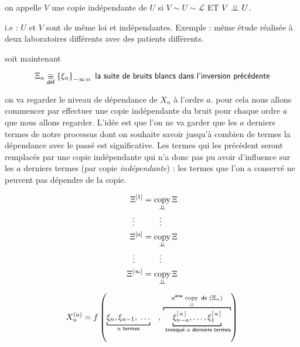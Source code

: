 \begin{definition}
	on appelle $V$ une copie indépendante de $U$ si $V \sim U \sim \mathcal L$ ET $V \perp \!\!\! \perp U$.

	i.e : $U$ et $V$ sont de même loi et indépendantes. Exemple : même étude réalisée à deux laboratoires différents avec des patients différents.
\end{definition}

soit maintenant

$$\Xi_n \underset {\textsf{déf}} {\equiv} \left\{ \xi_n\right\}_{-\infty : n} \textsf{ la suite de bruits blancs dans l'inversion précédente}$$

on va regarder le niveau de dépendance de $X_n$ à l'ordre $a$. pour cela nous allons commencer par effectuer une copie indépendante du bruit pour chaque ordre $a$ que nous allons regarder. L'idée est que l'on ne va garder que les $a$ derniers termes de notre processus dont on souhaite savoir jusqu'à combien de termes la dépendance avec le passé est significative. Les termes qui les précèdent seront remplacés par une copie indépendante qui n'a donc pas pu avoir d'influence sur les $a$ derniers termes (par copie \emph{indépendante}) : les termes que l'on a conservé ne peuvent pas dépendre de la copie.


\begin{minipage}{0.45\textwidth}

	\begin{align*}
		\Xi^{[1]}      & = \operatornamewithlimits{copy}\limits_{\indep} \Xi
		\\
		\vdots\quad    & \quad\quad \vdots
		\\
		\Xi^{[a]}      & = \operatornamewithlimits{copy}\limits_{\indep} \Xi
		\\ \vdots\quad &  \quad\quad \vdots
		\\
		\Xi^{[\infty]} & = \operatornamewithlimits{copy}\limits_{\indep} \Xi
	\end{align*}

\end{minipage}
%
\begin{minipage}{0.45\textwidth}
	$$X_n^{(a)} = f\left(
		\underbracket[0.187ex]{
			\xi_n, \xi_{n-1}, \; \dots}_
		{a \textsf{ termes}}
		\quad , \,
		\overbracket[0.187ex]
		{\underbracket[0.187ex]{\xi_{n-a}^{[\, a \, ]} , \dots , \xi_{1}^{[ \, a \, ]}}_
			{\textsf{ tronqué } a \textsf{ derniers termes}}
		}^{a^{\textsf{ème}} \, \operatornamewithlimits{copy}\limits_{\indep} \textsf{ de } (\Xi_n)}
		\right)$$
\end{minipage}

